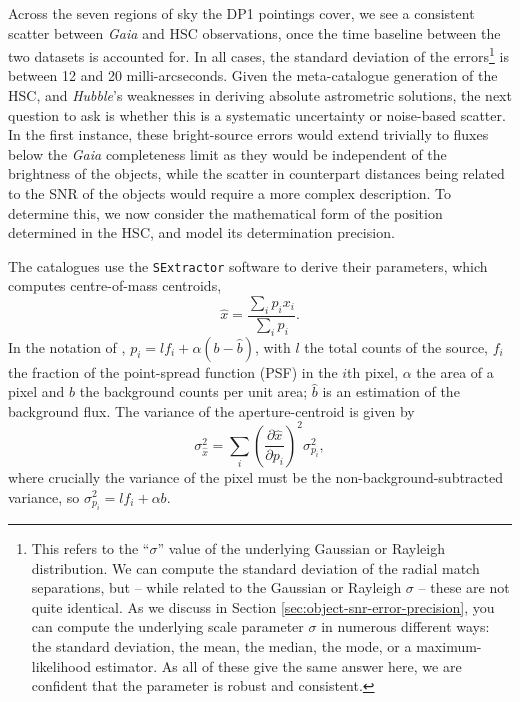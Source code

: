 \documentclass[SE,lsstdraft,authoryear,toc]{lsstdoc}
\begin{document}
Across the seven regions of sky the DP1 pointings cover, we see a consistent scatter between \textit{Gaia} and HSC observations, once the time baseline between the two datasets is accounted for.
In all cases, the standard deviation of the errors\footnote{This refers to the ``$\sigma$'' value of the underlying Gaussian or Rayleigh distribution. We can compute the standard deviation of the radial match separations, but -- while related to the Gaussian or Rayleigh $\sigma$ -- these are not quite identical. As we discuss in Section \ref{sec:object-snr-error-precision}, you can compute the underlying scale parameter $\sigma$ in numerous different ways: the standard deviation, the mean, the median, the mode, or a maximum-likelihood estimator. As all of these give the same answer here, we are confident that the parameter is robust and consistent.} is between 12 and 20 milli-arcseconds.
Given the meta-catalogue generation of the HSC, and \textit{Hubble}'s weaknesses in deriving absolute astrometric solutions, the next question to ask is whether this is a systematic uncertainty or noise-based scatter.
In the first instance, these bright-source errors would extend trivially to fluxes below the \textit{Gaia} completeness limit as they would be independent of the brightness of the objects, while the scatter in counterpart distances being related to the SNR of the objects would require a more complex description.
To determine this, we now consider the mathematical form of the position determined in the HSC, and model its determination precision.

The catalogues use the \texttt{SExtractor} software \citep{Bertin1996} to derive their parameters, which computes centre-of-mass centroids,
\begin{equation}
  \hat{x} = \frac{\sum_i p_i x_i}{\sum_i p_i}.
\end{equation}
In the notation of \citet{King:1983aa}, $p_i = l f_i + \alpha (b - \hat{b})$, with $l$ the total counts of the source, $f_i$ the fraction of the point-spread function (PSF) in the $i$th pixel, $\alpha$ the area of a pixel and $b$ the background counts per unit area; $\hat{b}$ is an estimation of the background flux.
The variance of the aperture-centroid is given by
\begin{equation}
  \sigma_{\hat{x}}^2 = \sum_i \left(\frac{\partial \hat{x}}{\partial p_i}\right)^2 \sigma_{p_i}^2,
\end{equation}
where crucially the variance of the pixel must be the non-background-subtracted variance, so $\sigma_{p_i}^2 = l f_i + \alpha b$.
\end{document}
